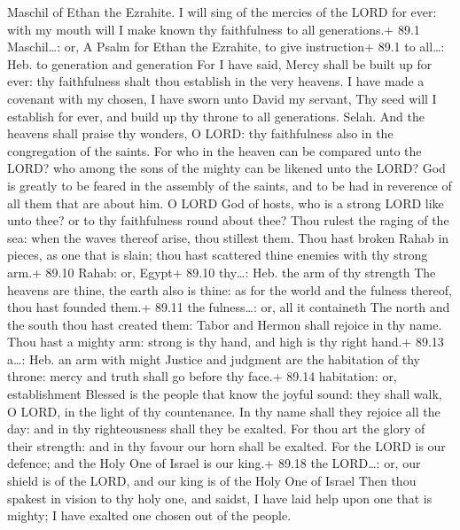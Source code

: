 Maschil of Ethan the Ezrahite.  I will sing of the mercies
of the LORD for ever: with my mouth will I make known thy faithfulness
to all generations.+ 89.1 Maschil\ldots: or, A Psalm for Ethan the
Ezrahite, to give instruction+ 89.1 to all\ldots: Heb. to generation and
generation  For I have said, Mercy shall be built up for
ever: thy faithfulness shalt thou establish in the very heavens.
 I have made a covenant with my chosen, I have sworn unto
David my servant,  Thy seed will I establish for ever, and
build up thy throne to all generations. Selah.  And the
heavens shall praise thy wonders, O LORD: thy faithfulness also in the
congregation of the saints.  For who in the heaven can be
compared unto the LORD? who among the sons of the mighty can be likened
unto the LORD?  God is greatly to be feared in the assembly
of the saints, and to be had in reverence of all them that are about
him.  O LORD God of hosts, who is a strong LORD like unto
thee? or to thy faithfulness round about thee?  Thou rulest
the raging of the sea: when the waves thereof arise, thou stillest them.
 Thou hast broken Rahab in pieces, as one that is slain;
thou hast scattered thine enemies with thy strong arm.+ 89.10 Rahab: or,
Egypt+ 89.10 thy\ldots: Heb. the arm of thy strength  The
heavens are thine, the earth also is thine: as for the world and the
fulness thereof, thou hast founded them.+ 89.11 the fulness\ldots: or,
all it containeth  The north and the south thou hast
created them: Tabor and Hermon shall rejoice in thy name. 
Thou hast a mighty arm: strong is thy hand, and high is thy right hand.+
89.13 a\ldots: Heb. an arm with might  Justice and judgment
are the habitation of thy throne: mercy and truth shall go before thy
face.+ 89.14 habitation: or, establishment  Blessed is the
people that know the joyful sound: they shall walk, O LORD, in the light
of thy countenance.  In thy name shall they rejoice all the
day: and in thy righteousness shall they be exalted.  For
thou art the glory of their strength: and in thy favour our horn shall
be exalted.  For the LORD is our defence; and the Holy One
of Israel is our king.+ 89.18 the LORD\ldots: or, our shield is of the
LORD, and our king is of the Holy One of Israel  Then thou
spakest in vision to thy holy one, and saidst, I have laid help upon one
that is mighty; I have exalted one chosen out of the people.
